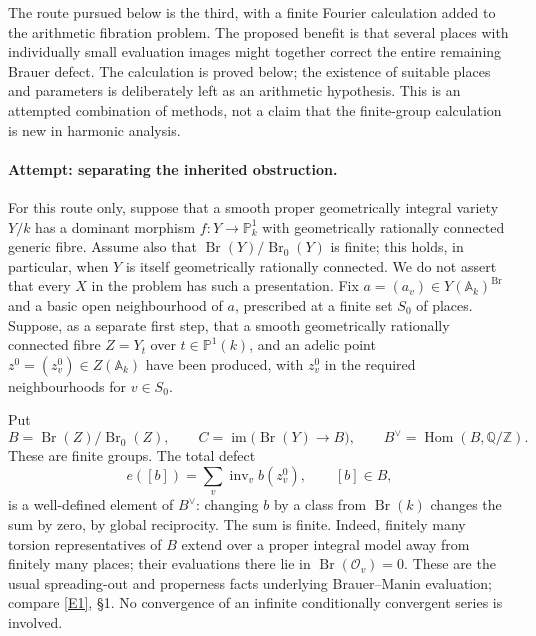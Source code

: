 \documentclass[11pt]{article}
\newcommand{\Z}{\mathbb{Z}}
\newcommand{\Q}{\mathbb{Q}}
\newcommand{\A}{\mathbb{A}}
\newcommand{\PP}{\mathbb P}
\newcommand{\eref}[2]{\hyperlink{extra:#1:#2}{[E#2]}}
\begin{document}
The route pursued below is the third, with a finite Fourier calculation added
to the arithmetic fibration problem.  The proposed benefit is that several
places with individually small evaluation images might together correct the
entire remaining Brauer defect.  The calculation is proved below; the existence
of suitable places and parameters is deliberately left as an arithmetic
hypothesis.  This is an attempted combination of methods, not a claim that
the finite-group calculation is new in harmonic analysis.

\paragraph{Attempt: separating the inherited obstruction.}
For this route only, suppose that a smooth proper geometrically integral variety $Y/k$ has a dominant
morphism $f:Y\to\PP^1_k$ with geometrically rationally connected generic fibre.
Assume also that $\operatorname{Br}(Y)/\operatorname{Br}_0(Y)$ is finite; this
holds, in particular, when $Y$ is itself geometrically rationally connected.
We do not assert that every $X$ in the problem has such a presentation.
Fix $a=(a_v)\in Y(\A_k)^{\operatorname{Br}}$ and a basic open neighbourhood of
$a$, prescribed at a finite set $S_0$ of places.  Suppose, as a separate first
step, that a smooth geometrically rationally connected fibre $Z=Y_t$ over
$t\in\PP^1(k)$, and an adelic point
$z^0=(z_v^0)\in Z(\A_k)$ have been produced, with $z_v^0$ in the required
neighbourhoods for $v\in S_0$.

Put
\[
 B=\operatorname{Br}(Z)/\operatorname{Br}_0(Z),\qquad
 C=\operatorname{im}\bigl(\operatorname{Br}(Y)\longrightarrow B\bigr),
 \qquad B^\vee=\operatorname{Hom}(B,\Q/\Z).
\]
These are finite groups.  The total defect
\begin{equation}\label{statement:defect}
 e([b])=\sum_v\operatorname{inv}_v b(z_v^0),\qquad [b]\in B,
\end{equation}
is a well-defined element of $B^\vee$: changing $b$ by a class from
$\operatorname{Br}(k)$ changes the sum by zero, by global reciprocity.  The
sum is finite.  Indeed, finitely many torsion representatives of $B$ extend
over a proper integral model away from finitely many places; their evaluations
there lie in $\operatorname{Br}(\mathcal O_v)=0$.  These are the usual
spreading-out and properness facts underlying Brauer--Manin evaluation;
compare \eref{statement}{1}, \S1.  No convergence of an infinite conditionally
convergent series is involved.
\end{document}
